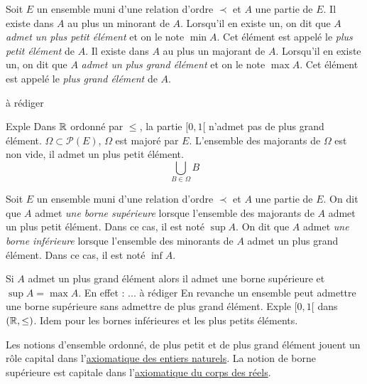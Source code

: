  
\begin{propdef}
  Soit $E$ un ensemble muni d'une relation d'ordre $\prec$ et $A$ une partie de $E$.\newline
Il existe dans $A$ au plus un minorant de $A$. Lorsqu'il en existe un, on dit que $A$ \emph{admet un plus petit élément} et on le note $\min A$. Cet élément est appelé le \emph{plus petit élément} de $A$.\newline
Il existe dans $A$ au plus un majorant de $A$. Lorsqu'il en existe un, on dit que $A$ \emph{admet un plus grand élément} et on le note $\max A$. Cet élément est appelé le \emph{plus grand élément} de $A$.
\end{propdef}
\begin{demo}
 à rédiger
\end{demo}


\begin{exple}
Exple Dans $\mathbb{R}$ ordonné par $\leq$, la partie $[0,1[$ n'admet pas de plus grand élément.\newline
$\Omega \subset \mathcal P(E)$, $\Omega$ est majoré par $E$. L'ensemble des majorants de $\Omega$ est non vide, il admet un plus petit élément. 
\begin{displaymath}
 \bigcup_{B\in \Omega}B
\end{displaymath}
\end{exple}

 
  
\begin{defi}
  Soit $E$ un ensemble muni d'une relation d'ordre $\prec$ et $A$ une partie de $E$.\newline
On dit que $A$ admet \emph{une borne supérieure} lorsque l'ensemble des majorants de $A$ admet un plus petit élément. Dans ce cas, il est noté $\sup A$.\newline
On dit que $A$ admet \emph{une borne inférieure} lorsque l'ensemble des minorants de $A$ admet un plus grand élément. Dans ce cas, il est noté $\inf A$.
\end{defi}
\begin{rem}
 Si $A$ admet un plus grand élément alors il admet une borne supérieure et $\sup A = \max A$.\newline
En effet : ... à rédiger\newline
En revanche un ensemble peut admettre une borne supérieure sans admettre de plus grand élément. Exple $[0,1[$ dans $(\mathbb{R},\leq)$. Idem pour les bornes inférieures et les plus petits éléments. 
\end{rem}
Les notions d'ensemble ordonné, de plus petit et de plus grand élément jouent un rôle capital dans l'\href{\baseurl C2007.pdf}{axiomatique des entiers naturels}.
La notion de borne supérieure est capitale dans l'\href{\baseurl C2192.pdf}{axiomatique du corps des réels}.


